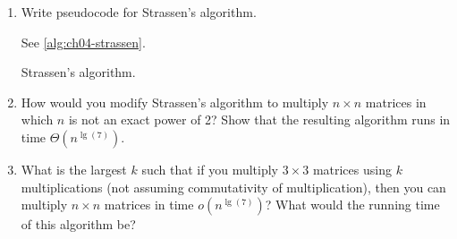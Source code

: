 \documentclass[Chapter04]{subfiles}
\begin{document}
\begin{enumerate}
		\item Write pseudocode for Strassen's algorithm.
		\begin{answer}
			See \cref{alg:ch04-strassen}.

			\begin{algorithm}[H]
				\caption{Strassen's algorithm.}
				\label{alg:ch04-strassen}

			\end{algorithm}
		\end{answer}

		\item How would you modify Strassen's algorithm to multiply $n \times n$ matrices in which $n$ is not an exact power of 2? Show that the resulting algorithm runs in time $\Theta(n^{\lg(7)})$.
		\begin{answer}
			
		\end{answer}

		\item What is the largest $k$ such that if you multiply $3 \times 3$ matrices using $k$ multiplications (not assuming commutativity of multiplication), then you can multiply $n \times n$ matrices in time $o(n^{\lg(7)})$? What would the running time of this algorithm be?
		\begin{answer}
			
		\end{answer}


\end{enumerate}
\end{document}
